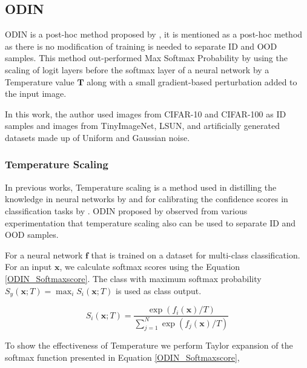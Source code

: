     \subsection{ODIN}
    \label{odin_explained}
    ODIN is a post-hoc method proposed by \citet{Liang2017}, it is mentioned as a post-hoc method as there is no modification of training is needed to separate ID and OOD samples. This method out-performed Max Softmax Probability by using the scaling of logit layers before the softmax layer of a neural network by a Temperature value $\mathbf{T}$ along with a small gradient-based perturbation added to the input image. 
    
    In this work, the author used images from CIFAR-10 and CIFAR-100 as ID samples and images from TinyImageNet, LSUN, and artificially generated datasets made up of Uniform and Gaussian noise. 
    
    \subsubsection{Temperature Scaling}
    In previous works, Temperature scaling is a method used in distilling the knowledge in neural networks by \citet{Hinton2015DistillingTK} and for calibrating the confidence scores in classification tasks by \cite{GuoCalibration2017}. ODIN proposed by \citet{Liang2017} observed from various experimentation that temperature scaling also can be used to separate ID and OOD samples.
    
    For a neural network $\mathbf{f}$ that is trained on a dataset for multi-class classification. For an input $\mathbf{x}$, we calculate softmax scores using the Equation \ref{ODIN_Softmaxscore}. The class with maximum softmax probability $S_{\hat{y}}(\boldsymbol{x} ; T)=\max _{i} S_{i}(\boldsymbol{x} ; T)$ is used as class output.
    
    \begin{equation}
        S_{i}(\boldsymbol{x} ; T)=\frac{\exp \left(f_{i}(\boldsymbol{x}) / T\right)}{\sum_{j=1}^{N} \exp \left(f_{j}(\boldsymbol{x}) / T\right)}
        \label{ODIN_Softmaxscore}
    \end{equation}
    
    To show the effectiveness of Temperature we perform Taylor expansion of the softmax function presented in Equation \ref{ODIN_Softmaxscore},
    
